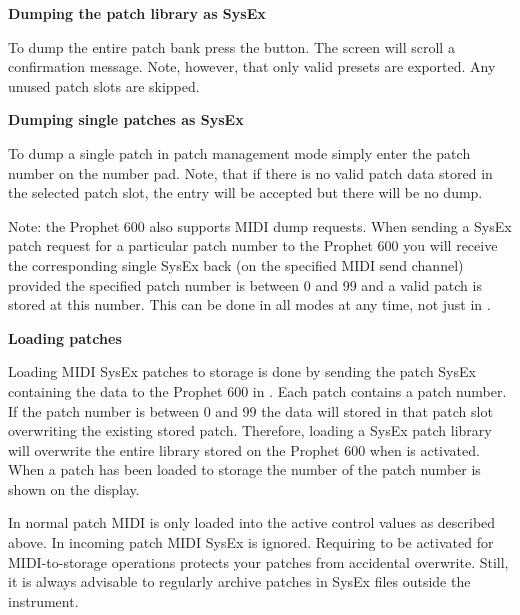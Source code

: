 {
}


\textbf{Dumping the patch library as SysEx} 

To dump the entire patch bank press the \preset button. The screen will scroll a confirmation message. Note, however, that only valid presets are exported. Any unused patch slots are skipped.

\textbf{Dumping single patches as SysEx} 

To dump a single patch in patch management mode simply enter the patch number on the number pad. Note, that if there is no valid patch data stored in the selected patch slot, the entry will be accepted but there will be no dump.

Note: the Prophet 600 also supports MIDI dump requests. When sending a SysEx patch request for a particular patch number to the Prophet 600 you will receive the corresponding single SysEx back (on the specified MIDI send channel) provided the specified patch number is between 0 and 99 and a valid patch is stored at this number. This can be done in all modes at any time, not just in \patchmgmt.

\textbf{Loading patches} 

Loading MIDI SysEx patches to storage is done by sending the patch SysEx containing the data to the Prophet 600 in \patchmgmt. Each patch contains a patch number. If the patch number is  between 0 and 99 the data will stored in that patch slot overwriting the existing stored patch. Therefore, loading a SysEx patch library will overwrite the entire library stored on the Prophet 600 when \patchmgmt is activated. When a patch has been loaded to storage the number of the patch number is shown on the display.

In normal \presetmode patch MIDI is only loaded into the active control values as described above. In \livemode incoming patch MIDI SysEx is ignored. Requiring \patchmgmt to be activated for MIDI-to-storage operations protects your patches from accidental overwrite. Still, it is always advisable to regularly archive patches in SysEx files outside the instrument.
